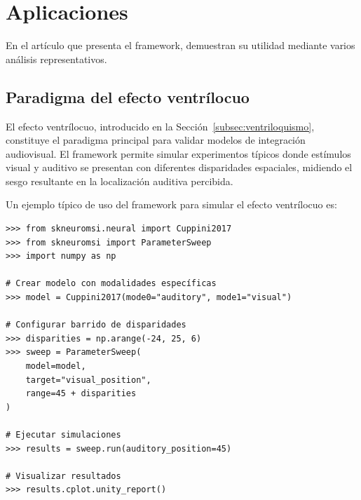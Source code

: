 
\section{Aplicaciones}
\label{sec:snmsi_aplicaciones}

En el artículo que presenta el framework, \citet{paredes2025scikit} demuestran su utilidad mediante varios análisis representativos.

\subsection{Paradigma del efecto ventrílocuo}
\label{subsec:snmsi_ventrilocuo}

El efecto ventrílocuo, introducido en la Sección~\ref{subsec:ventriloquismo}, constituye el paradigma principal para validar modelos de integración audiovisual. El framework permite simular experimentos típicos donde estímulos visual y auditivo se presentan con diferentes disparidades espaciales, midiendo el sesgo resultante en la localización auditiva percibida.

Un ejemplo típico de uso del framework para simular el efecto ventrílocuo es:

\begin{code}
\begin{verbatim}
>>> from skneuromsi.neural import Cuppini2017
>>> from skneuromsi import ParameterSweep
>>> import numpy as np

# Crear modelo con modalidades específicas
>>> model = Cuppini2017(mode0="auditory", mode1="visual")

# Configurar barrido de disparidades
>>> disparities = np.arange(-24, 25, 6)
>>> sweep = ParameterSweep(
    model=model,
    target="visual_position",
    range=45 + disparities
)

# Ejecutar simulaciones
>>> results = sweep.run(auditory_position=45)

# Visualizar resultados
>>> results.cplot.unity_report()
\end{verbatim}
\caption{
    Ejemplo del uso de Scikit-NeuroMSI para simular el efecto ventrílocuo. Se crea un modelo Cuppini2017 con modalidades auditiva y visual, se configura un barrido de disparidades espaciales, y se visualizan los resultados mediante el accessor de colección.
}
\label{code:usage}
\end{code}
\vspace{1.5em}


